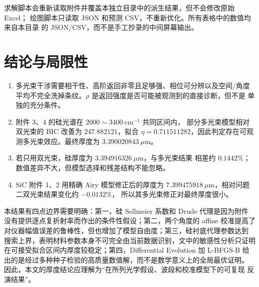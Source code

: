 \documentclass[UTF8,12pt,a4paper]{ctexart}
\begin{document}
求解脚本会重新读取附件并覆盖本独立目录中的派生结果，但不会修改原始 Excel；
绘图脚本只读取 JSON 和预测 CSV，不重新优化。所有表格中的数值均来自本目录
的 JSON/CSV，而不是手工抄录的中间屏幕输出。

\section{结论与局限性}

\begin{enumerate}[label=结论\arabic*：,leftmargin=5em]
  \item 多光束干涉需要相干性、高阶返回非零且足够强、相位可分辨以及空间/角度
  平均不完全洗掉条纹。$\rho$ 是返回强度是否可能被观测到的直接诊断，但不是
  单独的充分条件。
  \item 附件 3、4 的硅光谱在 $2000\sim3400\ \mathrm{cm}^{-1}$ 共同区间内，
  部分多光束模型相对双光束的 BIC 改善为 $247.882121$，拟合
  $\eta=0.711511282$，因此判定存在可观测多光束效应。最终厚度为
  $3.390020843\ \mu\mathrm{m}$。
  \item 若只用双光束，硅厚度为 $3.394916326\ \mu\mathrm{m}$，与多光束结果
  相差约 $0.1442\%$；数值差异不大，但模型选择和残差结构不能忽略。
  \item SiC 附件 1、2 用精确 Airy 模型修正后的厚度为
  $7.399475918\ \mu\mathrm{m}$，相对问题二双光束结果变化约 $-0.0132\%$，
  所以其多光束修正对最终厚度很小。
\end{enumerate}

本结果有四点边界需要明确：第一，硅 Sellmeier 系数和 Drude 代理是因为附件
没有提供逐点复折射率而作出的条件性假设；第二，两个角度的 affine 校准提高了
对仪器幅值误差的鲁棒性，但也增加了模型自由度；第三，硅衬底代理参数达到
搜索上界，表明材料参数本身不可完全由当前数据识别，文中的敏感性分析只证明
在可接受拟合区间内厚度较稳定；第四，Differential Evolution 加 L-BFGS-B
给出的是经过多种种子检验的高质量数值解，而不是数学意义上的全局最优证明。
因此，本文的厚度结论应理解为“在所列光学假设、波段和校准模型下的可复现
反演结果”。
\end{document}
